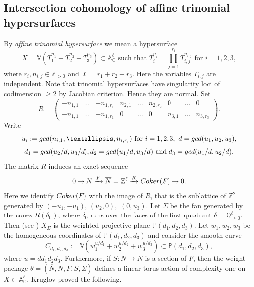 \documentclass[11pt, reqno]{amsart}
\theoremstyle{plain}
\theoremstyle{definition}
\theoremstyle{remark}
\begin{document}
\subsection{Intersection cohomology of affine trinomial hypersurfaces}\label{sec-trinomial-aff}
By \emph{affine trinomial hypersurface} we mean a hypersurface
$$X  =  \mathbb{V}(T_{1}^{\underline{n}_{1}} + T_{2}^{\underline{n}_{2}} + T_{3}^{\underline{n}_{3}}) \subset \mathbb{A}_{\mathbb{C}}^{\ell}
\text{ such that  }T_{i}^{\underline{n}_{i}} =  \prod_{j = 1}^{r_{i}} T_{i, j}^{n_{i,j}} \text{ for } i = 1,2,3,$$
where $r_{i}, n_{i,j}\in\mathbb{Z}_{> 0}$ and $\ell =  r_{1} + r_{2} + r_{3}$. Here the variables $T_{i,j}$ are independent. 
Note that trinomial hypersurfaces have singularity loci of codimension $\geq 2$ by Jacobian criterion. Hence they are normal.
Set
$$  R = \begin{pmatrix}
 -n_{1,1}& \ldots &  -n_{1, r_{1}} &  n_{2,1} &\ldots & n_{2,r_{2}} & 0& \ldots & 0\\
 -n_{1,1}& \ldots  &  -n_{1, r_{1}} &  0 &\ldots & 0 & n_{3,1} & \ldots & n_{3, r_{3}} 
\end{pmatrix}.$$
Write 
$$ u_{i}:= {\rm gcd}(n_{i,1}, \ldots, n_{i, r_{i}}) \text{ for } i = 1,2,3, \,\, d =  {\rm gcd}(u_{1}, u_{2}, u_{3}),$$
$$ d_{1}  =  {\rm gcd}(u_{2}/d, u_{3}/d), d_{2}  =  {\rm gcd}(u_{1}/d, u_{3}/d) \text{ and } d_{3}  =  {\rm gcd}(u_{1}/d, u_{2}/d).$$
The matrix $R$ induces an exact sequence 
$$0\rightarrow N \xrightarrow{F} \overline{N} =  \mathbb{Z}^{\ell}\xrightarrow{R} {\rm Coker}(F)\rightarrow 0.$$
Here we identify ${\rm Coker}(F)$ with the image of $R$, that is the sublattice of $\mathbb{Z}^{2}$ generated
by $(-u_{1}, -u_{1})$, $(u_{2}, 0),$ $(0, u_{3})$. Let $\Sigma$ be the fan generated by the cones $R(\delta_{0})$, where
$\delta_{0}$ runs over the faces of the first quadrant $\delta =  \mathbb{Q}_{\geq 0}^{\ell}.$ Then 
 (see \cite[Section 4]{Kru19}) $X_{\Sigma}$ is the weighted projective plane $\mathbb{P}(d_{1}, d_{2}, d_{3})$. Let $w_{1}, w_{2}, w_{3}$ be the homogeneous coordinates of $\mathbb{P}(d_{1}, d_{2}, d_{3})$ and consider the smooth curve
$$ C_{d_{1}, d_{2}, d_{3}} := \mathbb{V}( w_{1}^{u/d_{1}} + w_{2}^{u/d_{2}} + w_{3}^{u/d_{3}})\subset \mathbb{P}(d_{1}, d_{2}, d_{3}), $$
where $u =  d d_{1} d_{2} d_{3}$. Furthermore, if $S: \overline{N}\rightarrow N$ is a section of $F$, then the weight package 
$\theta =  (\overline{N}, N, F, S, \Sigma)$ defines a linear torus action of complexity one on $X \subset \mathbb{A}_{\mathbb{C}}^{\ell}$. Kruglov proved the following.
\end{document}
